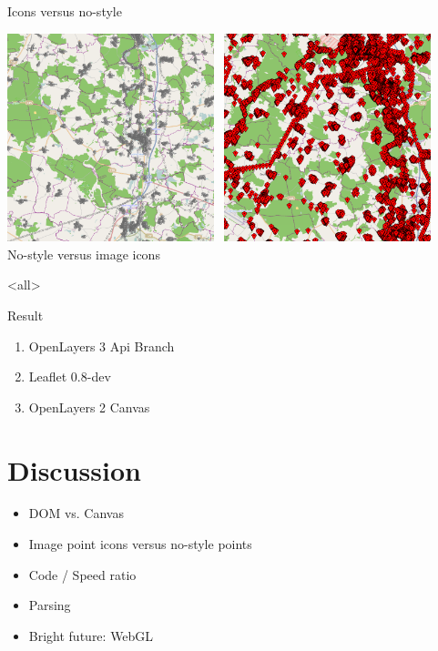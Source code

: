 \documentclass[xcolor=dvipsnames]{beamer}
\begin{document}
\begin{frame}{Icons versus no-style}
\begin{center}
    \includegraphics[width=0.45\textwidth]{images/no-style.png}~
    \includegraphics[width=0.45\textwidth]{images/icons.png}\\

    No-style versus image icons

\end{center}
\end{frame}

\mode<all>


\begin{frame}{Result}
\begin{enumerate}[<+->]
    \item OpenLayers 3 Api Branch
    \item Leaflet 0.8-dev
    \item OpenLayers 2 Canvas
\end{enumerate}
\end{frame}

\section{Discussion}
\begin{frame}
\begin{itemize}[<+->]
    \item DOM vs. Canvas
    \item Image point icons versus no-style points
    \item Code / Speed ratio
    \item Parsing
    \item Bright future: WebGL
\end{itemize}
\end{frame}
\end{document}
